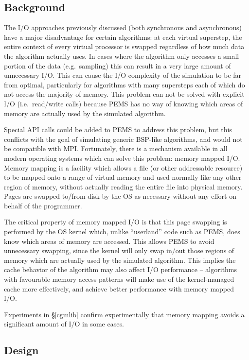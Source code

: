 \documentclass[12pt]{carletoncsthesis}
\begin{document}
\subsection{Background}


The I/O approaches previously discussed (both synchronous and asynchronous)
have a major disadvantage for certain algorithms: at each virtual superstep,
the entire context of every virtual processor is swapped regardless of how
much data the algorithm actually uses.  In cases where the algorithm only
accesses a small portion of the data (e.g.\ sampling) this can result in a
very large amount of unnecessary I/O.  This can cause the I/O complexity
of the simulation to be far from optimal, particularly for algorithms
with many supersteps each of which do not access the majority of memory.
This problem can not be solved with explicit I/O (i.e.\ read/write calls)
because PEMS has no way of knowing which areas of memory are actually used
by the simulated algorithm.

Special API calls could be added to PEMS to address this problem, but
this conflicts with the goal of simulating generic BSP-like algorithms,
and would not be compatible with MPI.  Fortunately, there is a mechanism
available in all modern operating systems which can solve this problem:
memory mapped I/O.  Memory mapping is a facility which allows a file (or
other addressable resource) to be mapped onto a range of virtual memory and
used normally like any other region of memory, without actually reading the
entire file into physical memory.  Pages are swapped to/from disk by the OS
as necessary without any effort on behalf of the programmer.

The critical property of memory mapped I/O is that this page swapping is
performed by the OS kernel which, unlike ``userland'' code such as PEMS,
does know which areas of memory are accessed.  This allows PEMS to avoid
unnecessary swapping, since the kernel will only swap in/out those regions
of memory which are actually used by the simulated algorithm.  This implies
the cache behavior of the algorithm may also affect I/O performance --
algorithms with favourable memory access patterns will make use of the
kernel-managed cache more effectively, and achieve better performance
with memory mapped I/O.

Experiments in \S\ref{cgmlib} confirm experimentally that memory mapping
avoids a significant amount of I/O in some cases.

\subsection{Design}
\end{document}
